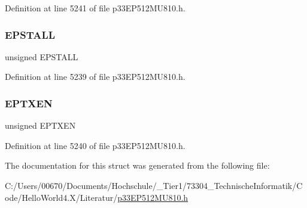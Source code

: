 Definition at line 5241 of file p33\+E\+P512\+M\+U810.\+h.

\mbox{\label{structtag_u1_e_p12_b_i_t_s_a47042104f04ebe06a23f9789bd400d7e}} 
\subsubsection{\texorpdfstring{E\+P\+S\+T\+A\+LL}{EPSTALL}}
{\footnotesize\ttfamily unsigned E\+P\+S\+T\+A\+LL}



Definition at line 5239 of file p33\+E\+P512\+M\+U810.\+h.

\mbox{\label{structtag_u1_e_p12_b_i_t_s_aa2d88c1be513e759c136823c86a355b4}} 
\subsubsection{\texorpdfstring{E\+P\+T\+X\+EN}{EPTXEN}}
{\footnotesize\ttfamily unsigned E\+P\+T\+X\+EN}



Definition at line 5240 of file p33\+E\+P512\+M\+U810.\+h.



The documentation for this struct was generated from the following file\+:\begin{DoxyCompactItemize}
\item 
C\+:/\+Users/00670/\+Documents/\+Hochschule/\+\_\+\+Tier1/73304\+\_\+\+Technische\+Informatik/\+Code/\+Hello\+World4.\+X/\+Literatur/\hyperlink{p33_e_p512_m_u810_8h}{p33\+E\+P512\+M\+U810.\+h}\end{DoxyCompactItemize}
